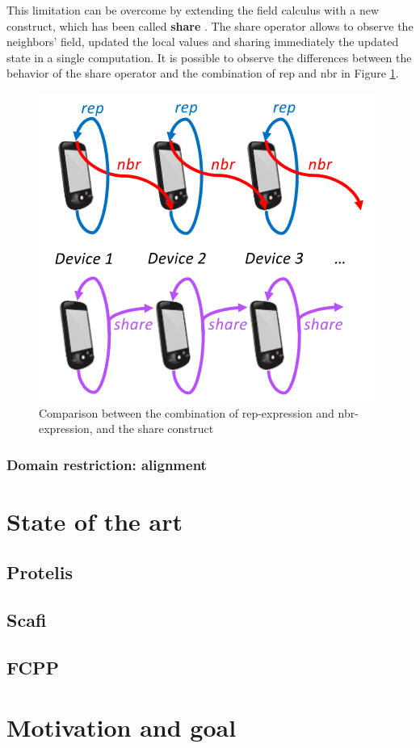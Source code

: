 This limitation can be overcome by extending the field calculus with a new construct, which has been called \textbf{share} \cite{share_operator}. The share operator allows to observe the neighbors' field, updated the local values and sharing immediately the updated state in a single computation. It is possible to observe the differences between the behavior of the share operator and the combination of rep and nbr in Figure \ref{fig:share_operator_introduction}.

\begin{figure}[!ht]
    \centering
    \includegraphics[scale=0.8]{document/chapters/1-introduction/images/share_operator_introduction.png}
    \caption{Comparison between the combination of rep-expression and nbr-expression, and the share construct \cite{share_operator}}
    \label{fig:share_operator_introduction}
\end{figure}

\subsubsection{Domain restriction: alignment}\label{section:alignment}

\section{State of the art}
\subsection{Protelis}
\subsection{Scafi}
\subsection{FCPP}

\section{Motivation and goal}
